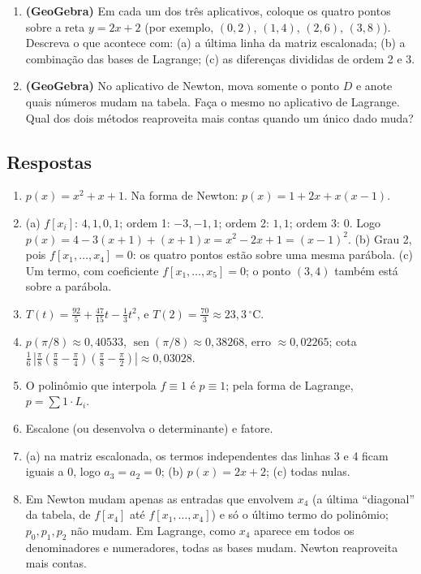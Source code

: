 \begin{enumerate}[label=\textbf{\arabic*.},leftmargin=*]
\item \textbf{(GeoGebra)} Em cada um dos três aplicativos, coloque os quatro pontos sobre a
  reta $y=2x+2$ (por exemplo, $(0,2)$, $(1,4)$, $(2,6)$, $(3,8)$). Descreva o que acontece
  com: (a) a última linha da matriz escalonada; (b) a combinação das bases de Lagrange;
  (c) as diferenças divididas de ordem 2 e 3.

\item \textbf{(GeoGebra)} No aplicativo de Newton, mova somente o ponto $D$ e anote quais
  números mudam na tabela. Faça o mesmo no aplicativo de Lagrange. Qual dos dois métodos
  reaproveita mais contas quando um único dado muda?
\end{enumerate}

\subsection*{Respostas}
\begin{enumerate}[label=\textbf{\arabic*.},leftmargin=*,nosep]
\item $p(x)=x^2+x+1$. Na forma de Newton: $p(x)=1+2x+x(x-1)$.
\item (a) $f[x_i]$: $4,1,0,1$; ordem 1: $-3,-1,1$; ordem 2: $1,1$; ordem 3: $0$. Logo
  $p(x)=4-3(x+1)+(x+1)x=x^2-2x+1=(x-1)^2$. (b) Grau 2, pois $f[x_1,\dots,x_4]=0$: os quatro
  pontos estão sobre uma mesma parábola. (c) Um termo, com coeficiente
  $f[x_1,\dots,x_5]=0$; o ponto $(3,4)$ também está sobre a parábola.
\item $T(t)=\frac{92}{5}+\frac{47}{15}t-\frac13t^2$, e $T(2)=\frac{70}{3}\approx23{,}3\,^\circ$C.
\item $p(\pi/8)\approx0{,}40533$, $\operatorname{sen}(\pi/8)\approx0{,}38268$, erro
  $\approx0{,}02265$; cota $\frac16\,|\tfrac{\pi}{8}(\tfrac{\pi}{8}-\tfrac{\pi}{4})(\tfrac{\pi}{8}-\tfrac{\pi}{2})|\approx0{,}03028$.
\item O polinômio que interpola $f\equiv1$ é $p\equiv1$; pela forma de Lagrange, $p=\sum 1\cdot L_i$.
\item Escalone (ou desenvolva o determinante) e fatore.
\item (a) na matriz escalonada, os termos independentes das linhas 3 e 4 ficam iguais a 0, logo $a_3=a_2=0$;
  (b) $p(x)=2x+2$; (c) todas nulas.
\item Em Newton mudam apenas as entradas que envolvem $x_4$ (a última ``diagonal'' da tabela,
  de $f[x_4]$ até $f[x_1,\dots,x_4]$) e só o último termo do polinômio; $p_0,p_1,p_2$ não mudam.
  Em Lagrange, como $x_4$ aparece em todos os denominadores e numeradores, todas as bases mudam.
  Newton reaproveita mais contas.
\end{enumerate}
